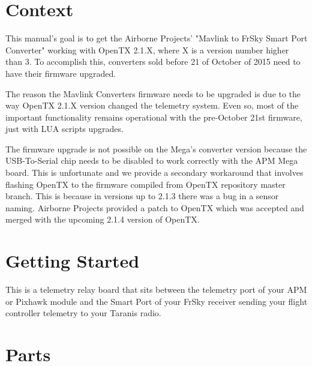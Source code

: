 \documentclass[english]{article}
\begin{document}

\clearpage
\tableofcontents
\clearpage
{}
\setcounter{page}{1}
\section{Context}

This manual's goal is to get the Airborne Projects' "Mavlink to FrSky Smart Port Converter" working with OpenTX 2.1.X, where X is a version number higher than 3. To accomplish this, converters sold before 21 of October of 2015 need to have their firmware upgraded.

The reason the Mavlink Converters firmware needs to be upgraded is due to the way OpenTX 2.1.X version changed the telemetry system. Even so, most of the important functionality remains operational with the pre-October 21st firmware, just with LUA scripts upgrades.

The firmware upgrade is not possible on the Mega's converter version because the USB-To-Serial chip needs to be disabled to work correctly with the APM Mega board. This is unfortunate and we provide a secondary workaround that involves flashing OpenTX to the firmware compiled from OpenTX repository master branch. This is because in versions up to 2.1.3 there was a bug in a sensor naming. Airborne Projects provided a patch to OpenTX which was accepted and merged with the upcoming 2.1.4 version of OpenTX.

\section{Getting Started}

This is a telemetry relay board that sits between the telemetry port of your APM or Pixhawk module and the Smart Port of your FrSky receiver sending your flight controller telemetry to your Taranis radio.

\section{Parts}
\end{document}
